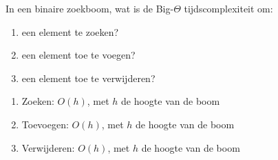 \begin{oef}
\papier In een binaire zoekboom, wat is de Big-\(\Theta\) tijdscomplexiteit om:
\begin{enumerate}
\item een element te zoeken? 
\item een element toe te voegen?
\item een element toe te verwijderen?
\end{enumerate}

\begin{opl}
\begin{enumerate}
\item Zoeken: \(O(h)\), met \(h\) de hoogte van de boom
\item Toevoegen: \(O(h)\), met \(h\) de hoogte van de boom 
\item Verwijderen: \(O(h)\), met \(h\) de hoogte van de boom 
\end{enumerate}
\end{opl}
\end{oef}